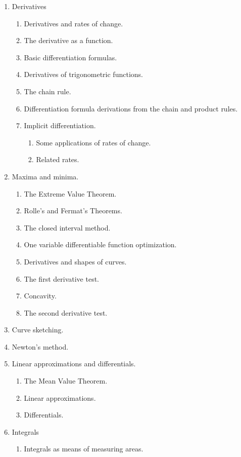 \documentclass{article}
\begin{document}
\begin{enumerate}[label*=\arabic*.]
\item Derivatives
\begin{enumerate}[label*=\arabic*.]
\item Derivatives and rates of change.
\item The derivative as a function.
\item Basic differentiation formulas.
\item Derivatives of trigonometric functions.
\item The chain rule.
\item Differentiation formula derivations from the chain and product rules.
\item Implicit differentiation.
\begin{enumerate}[label*=\arabic*.]
\item Some applications of rates of change.
\item Related rates.
\end{enumerate}
\end{enumerate}
\item Maxima and minima.
\begin{enumerate}[label*=\arabic*.]
\item The Extreme Value Theorem.
\item Rolle's and Fermat's Theorems.
\item The closed interval method.
\item One variable differentiable function optimization.
\item Derivatives and shapes of curves.
\item The first derivative test.
\item Concavity.
\item The second derivative test. 
\end{enumerate}
\item Curve sketching.
\item Newton's method.
\item Linear approximations and differentials.
\begin{enumerate}[label*=\arabic*.]
\item The Mean Value Theorem.
\item Linear approximations.
\item Differentials.
\end{enumerate}
\item Integrals
\begin{enumerate}[label*=\arabic*.]
\item Integrals as means of measuring areas.

\end{enumerate}
\end{enumerate}
\end{document}
